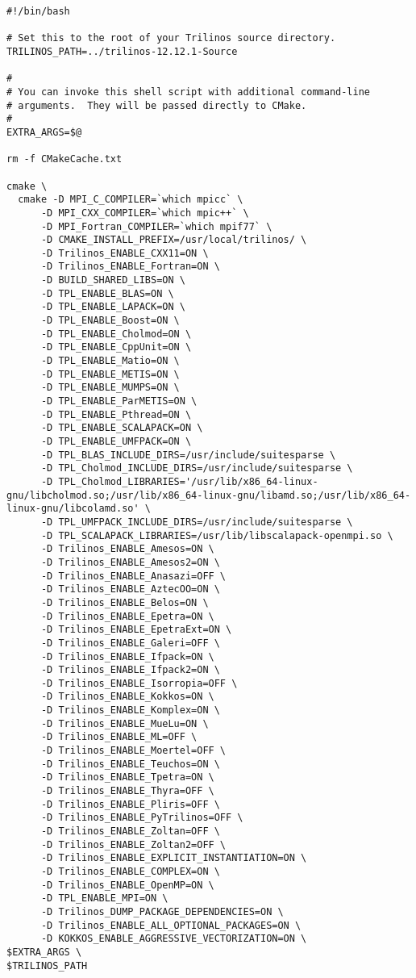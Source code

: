 \begin{verbatim}
#!/bin/bash

# Set this to the root of your Trilinos source directory.
TRILINOS_PATH=../trilinos-12.12.1-Source

#
# You can invoke this shell script with additional command-line
# arguments.  They will be passed directly to CMake.
#
EXTRA_ARGS=$@

rm -f CMakeCache.txt

cmake \
  cmake -D MPI_C_COMPILER=`which mpicc` \
      -D MPI_CXX_COMPILER=`which mpic++` \
      -D MPI_Fortran_COMPILER=`which mpif77` \
      -D CMAKE_INSTALL_PREFIX=/usr/local/trilinos/ \
      -D Trilinos_ENABLE_CXX11=ON \
      -D Trilinos_ENABLE_Fortran=ON \
      -D BUILD_SHARED_LIBS=ON \
      -D TPL_ENABLE_BLAS=ON \
      -D TPL_ENABLE_LAPACK=ON \
      -D TPL_ENABLE_Boost=ON \
      -D TPL_ENABLE_Cholmod=ON \
      -D TPL_ENABLE_CppUnit=ON \
      -D TPL_ENABLE_Matio=ON \
      -D TPL_ENABLE_METIS=ON \
      -D TPL_ENABLE_MUMPS=ON \
      -D TPL_ENABLE_ParMETIS=ON \
      -D TPL_ENABLE_Pthread=ON \
      -D TPL_ENABLE_SCALAPACK=ON \
      -D TPL_ENABLE_UMFPACK=ON \
      -D TPL_BLAS_INCLUDE_DIRS=/usr/include/suitesparse \
      -D TPL_Cholmod_INCLUDE_DIRS=/usr/include/suitesparse \
      -D TPL_Cholmod_LIBRARIES='/usr/lib/x86_64-linux-gnu/libcholmod.so;/usr/lib/x86_64-linux-gnu/libamd.so;/usr/lib/x86_64-linux-gnu/libcolamd.so' \
      -D TPL_UMFPACK_INCLUDE_DIRS=/usr/include/suitesparse \
      -D TPL_SCALAPACK_LIBRARIES=/usr/lib/libscalapack-openmpi.so \
      -D Trilinos_ENABLE_Amesos=ON \
      -D Trilinos_ENABLE_Amesos2=ON \
      -D Trilinos_ENABLE_Anasazi=OFF \
      -D Trilinos_ENABLE_AztecOO=ON \
      -D Trilinos_ENABLE_Belos=ON \
      -D Trilinos_ENABLE_Epetra=ON \
      -D Trilinos_ENABLE_EpetraExt=ON \
      -D Trilinos_ENABLE_Galeri=OFF \
      -D Trilinos_ENABLE_Ifpack=ON \
      -D Trilinos_ENABLE_Ifpack2=ON \
      -D Trilinos_ENABLE_Isorropia=OFF \
      -D Trilinos_ENABLE_Kokkos=ON \
      -D Trilinos_ENABLE_Komplex=ON \
      -D Trilinos_ENABLE_MueLu=ON \
      -D Trilinos_ENABLE_ML=OFF \
      -D Trilinos_ENABLE_Moertel=OFF \
      -D Trilinos_ENABLE_Teuchos=ON \
      -D Trilinos_ENABLE_Tpetra=ON \
      -D Trilinos_ENABLE_Thyra=OFF \
      -D Trilinos_ENABLE_Pliris=OFF \
      -D Trilinos_ENABLE_PyTrilinos=OFF \
      -D Trilinos_ENABLE_Zoltan=OFF \
      -D Trilinos_ENABLE_Zoltan2=OFF \
      -D Trilinos_ENABLE_EXPLICIT_INSTANTIATION=ON \
      -D Trilinos_ENABLE_COMPLEX=ON \
      -D Trilinos_ENABLE_OpenMP=ON \
      -D TPL_ENABLE_MPI=ON \
      -D Trilinos_DUMP_PACKAGE_DEPENDENCIES=ON \
      -D Trilinos_ENABLE_ALL_OPTIONAL_PACKAGES=ON \
      -D KOKKOS_ENABLE_AGGRESSIVE_VECTORIZATION=ON \
$EXTRA_ARGS \
$TRILINOS_PATH
\end{verbatim}
